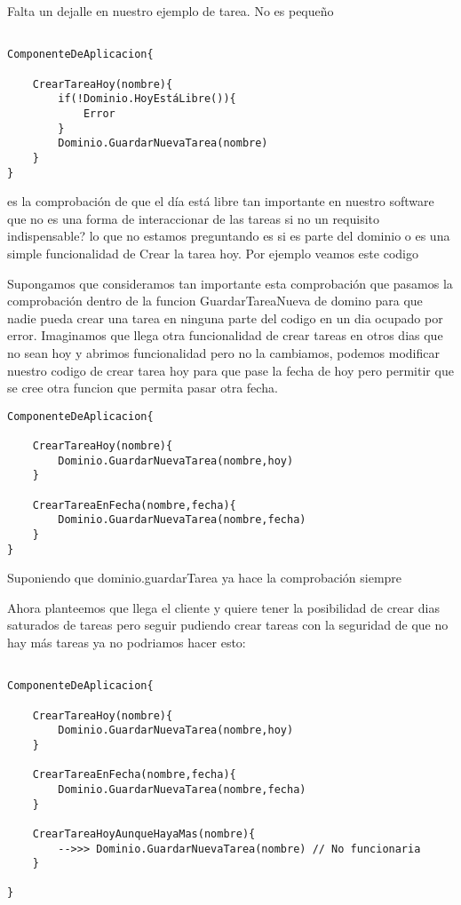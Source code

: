 Falta un dejalle en nuestro ejemplo de tarea. No es pequeño

\begin{verbatim}

ComponenteDeAplicacion{

    CrearTareaHoy(nombre){
        if(!Dominio.HoyEstáLibre()){
            Error
        }
        Dominio.GuardarNuevaTarea(nombre)
    }
}

\end{verbatim}


es la comprobación de que el día está libre tan importante en nuestro software que no es una forma de interaccionar de las tareas
si no un requisito indispensable? lo que no estamos preguntando es si es parte del dominio o es una simple funcionalidad de Crear la tarea hoy. Por ejemplo veamos este codigo

Supongamos que consideramos tan importante esta comprobación que pasamos la comprobación dentro de la funcion GuardarTareaNueva de domino para que nadie pueda crear una tarea en ninguna parte del codigo en un dia ocupado por error. Imaginamos que llega otra funcionalidad de crear tareas en otros dias que no sean hoy y abrimos funcionalidad pero no la cambiamos, podemos modificar nuestro codigo de crear tarea hoy para que pase la fecha de hoy pero permitir que se cree otra funcion que permita pasar otra fecha.

\begin{verbatim}
ComponenteDeAplicacion{

    CrearTareaHoy(nombre){
        Dominio.GuardarNuevaTarea(nombre,hoy)
    }

    CrearTareaEnFecha(nombre,fecha){
        Dominio.GuardarNuevaTarea(nombre,fecha)
    }
}

\end{verbatim}

Suponiendo que dominio.guardarTarea ya hace la comprobación siempre


Ahora planteemos que llega el cliente y quiere tener la posibilidad de crear dias saturados de tareas pero seguir pudiendo crear tareas con la seguridad de que no hay más tareas ya no podriamos hacer esto:

\begin{verbatim}

ComponenteDeAplicacion{

    CrearTareaHoy(nombre){
        Dominio.GuardarNuevaTarea(nombre,hoy)
    }

    CrearTareaEnFecha(nombre,fecha){
        Dominio.GuardarNuevaTarea(nombre,fecha)
    }

    CrearTareaHoyAunqueHayaMas(nombre){
        -->>> Dominio.GuardarNuevaTarea(nombre) // No funcionaria
    }

}
\end{verbatim}

